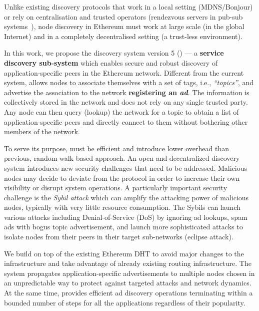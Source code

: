 Unlike existing discovery protocols that work in a local setting (MDNS/Bonjour) or rely on centralisation and trusted operators (\eg rendezvous servers in pub-sub systems~\cite{}), node discovery in Ethereum must work at large scale (in the global Internet) and in a completely decentralised setting  (\ie a trust-less environment). 

 In this work, we propose the discovery system version 5 (\textit{\sysname}) --- a \textbf{service discovery sub-system} which enables secure and robust discovery of application-specific peers in the Ethereum network. Different from the current system, \sysname allows nodes to associate themselves with a set of tags, i.e., \textit{``topics''}, and advertise the association to the network \ie  \textbf{registering an \emph{ad}}. The information is collectively stored in the network and does not rely on any single trusted party. Any node can then query (\ie lookup) the network for a topic to obtain a list of application-specific peers and directly connect to them without bothering other members of the network. 

To serve its purpose, \sysname must be efficient and introduce lower overhead than previous, random walk-based approach. An open and decentralized discovery system introduces new security challenges that need to be addressed. Malicious nodes may decide to deviate from the protocol in order to increase their own visibility or disrupt system operations. A particularly important security challenge is the \textit{Sybil attack} which can amplify the attacking power of malicious nodes, typically with very little resource consumption. The Sybils can launch various attacks including Denial-of-Service (DoS) by ignoring ad lookups, spam ads with bogus topic advertisement, and launch more sophisticated attacks to isolate nodes from their peers in their target sub-networks (\ie eclipse attack). 

We build \sysname on top of the existing Ethereum DHT to avoid major changes to the infrastructure and take advantage of already existing routing infrastructure. The system propagates application-specific advertisements to multiple nodes chosen in an unpredictable way to protect against targeted attacks and network dynamics. At the same time, \sysname provides efficient ad discovery operations terminating within a bounded number of steps for all the applications regardless of their popularity.

